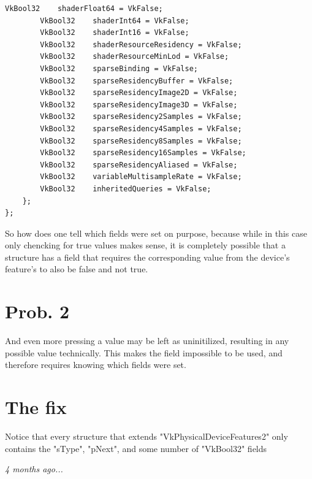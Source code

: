 \documentclass{article}
\begin{document}
\begin{lstlisting}[mathescape]
        VkBool32    shaderFloat64 = VkFalse;
        VkBool32    shaderInt64 = VkFalse;
        VkBool32    shaderInt16 = VkFalse;
        VkBool32    shaderResourceResidency = VkFalse;
        VkBool32    shaderResourceMinLod = VkFalse;
        VkBool32    sparseBinding = VkFalse;
        VkBool32    sparseResidencyBuffer = VkFalse;
        VkBool32    sparseResidencyImage2D = VkFalse;
        VkBool32    sparseResidencyImage3D = VkFalse;
        VkBool32    sparseResidency2Samples = VkFalse;
        VkBool32    sparseResidency4Samples = VkFalse;
        VkBool32    sparseResidency8Samples = VkFalse;
        VkBool32    sparseResidency16Samples = VkFalse;
        VkBool32    sparseResidencyAliased = VkFalse;
        VkBool32    variableMultisampleRate = VkFalse;
        VkBool32    inheritedQueries = VkFalse;
    };
};
\end{lstlisting}
So how does one tell which fields were set on purpose, 
because while in this case only chencking for true values makes sense, 
it is completely possible that a structure has a field that requires the corresponding
value from the device's feature's to also be false and not true.

\section{Prob. 2}
And even more pressing a value may be left as uninitilized, 
resulting in any possible value technically. This makes the field 
impossible to be used, and therefore requires knowing which fields 
were set.

\section{The fix}
Notice that every structure that extends "VkPhysicalDeviceFeatures2" 
only contains the "sType", "pNext", and some number of "VkBool32" fields

\textit{4 months ago...}
\end{document}
